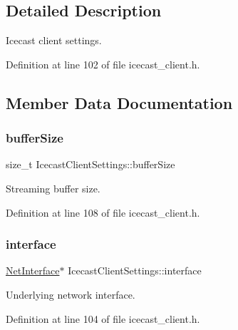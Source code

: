 \subsection{Detailed Description}
Icecast client settings. 

Definition at line 102 of file icecast\+\_\+client.\+h.



\subsection{Member Data Documentation}
\mbox{\label{structIcecastClientSettings_a6957adef33fd7059c925a5f89cb676fc}} 
\subsubsection{\texorpdfstring{buffer\+Size}{bufferSize}}
{\footnotesize\ttfamily size\+\_\+t Icecast\+Client\+Settings\+::buffer\+Size}



Streaming buffer size. 



Definition at line 108 of file icecast\+\_\+client.\+h.

\mbox{\label{structIcecastClientSettings_a52a70857811f6337d011b835916e9fe2}} 
\subsubsection{\texorpdfstring{interface}{interface}}
{\footnotesize\ttfamily \hyperlink{net_8h_a2234db8911a1148c9159979d8f5e0d6b}{Net\+Interface}$\ast$ Icecast\+Client\+Settings\+::interface}



Underlying network interface. 



Definition at line 104 of file icecast\+\_\+client.\+h.

\mbox{\label{structIcecastClientSettings_a81f6aaa6b4b3aacb4a267b058afa632e}} 
